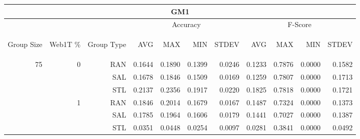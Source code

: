 \begin{center}
\begin{table}[htbp]
\begin{tabular}{ | r | r | r | r | r | r | r | r | r | r | r |}
\hline
\multicolumn{11}{|c|}{GM1}\\
\hline
 & & & \multicolumn{4}{|c|}{Accuracy} & \multicolumn{4}{|c|}{F-Score}\\ \cline{4-11}
\begin{sideways}Group Size\end{sideways} & \begin{sideways}Web1T \%\end{sideways} & \begin{sideways}Group Type\end{sideways} & \begin{sideways}AVG\end{sideways} & \begin{sideways}MAX\end{sideways} & \begin{sideways}MIN\end{sideways} & \begin{sideways}STDEV\end{sideways} & \begin{sideways}AVG\end{sideways} & \begin{sideways}MAX\end{sideways} & \begin{sideways}MIN\end{sideways} & \begin{sideways}STDEV\end{sideways}\\
\hline
\multirow{18}{*}{75}
 & \multirow{3}{*}{0} & RAN & 0.1644 & 0.1890 & 0.1399 & 0.0246 & 0.1233 & 0.7876 & 0.0000 & 0.1582\\ \cline{3-11}
 &   & SAL & 0.1678 & 0.1846 & 0.1509 & 0.0169 & 0.1259 & 0.7807 & 0.0000 & 0.1713\\ \cline{3-11}
 &   & STL & 0.2137 & 0.2356 & 0.1917 & 0.0220 & 0.1825 & 0.7818 & 0.0000 & 0.1721\\ \cline{2-11}
 & \multirow{3}{*}{1} & RAN & 0.1846 & 0.2014 & 0.1679 & 0.0167 & 0.1487 & 0.7324 & 0.0000 & 0.1373\\ \cline{3-11}
 &   & SAL & 0.1785 & 0.1964 & 0.1606 & 0.0179 & 0.1441 & 0.7027 & 0.0000 & 0.1387\\ \cline{3-11}
 &   & STL & 0.0351 & 0.0448 & 0.0254 & 0.0097 & 0.0281 & 0.3841 & 0.0000 & 0.0492\\ \cline{2-11}

\end{tabular}
\end{table}
\end{center}
